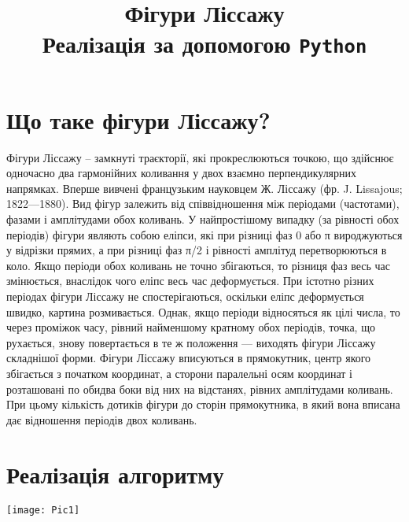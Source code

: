 \documentclass[14pt]{extarticle}
\title{Фігури Ліссажу\\ Реалізація за допомогою \texttt{Python}}
\date{}
\begin{document}
\maketitle

\section{Що таке фігури Ліссажу?}

Фігури Ліссажу -- замкнуті траєкторії, які прокреслюються точкою, що здійснює одночасно два гармонійних коливання у двох взаємно перпендикулярних напрямках. Вперше вивчені французьким науковцем Ж. Ліссажу (фр. J. Lissajous; 1822—1880). Вид фігур залежить від співвідношення між періодами (частотами), фазами і амплітудами обох коливань. У найпростішому випадку (за рівності обох періодів) фігури являють собою еліпси, які при різниці фаз 0 або π вироджуються у відрізки прямих, а при різниці фаз π/2 і рівності амплітуд перетворюються в коло. Якщо періоди обох коливань не точно збігаються, то різниця фаз весь час змінюється, внаслідок чого еліпс весь час деформується. При істотно різних періодах фігури Ліссажу не спостерігаються, оскільки еліпс деформується швидко, картина розмивається. Однак, якщо періоди відносяться як цілі числа, то через проміжок часу, рівний найменшому кратному обох періодів, точка, що рухається, знову повертається в те ж положення — виходять фігури Ліссажу складнішої форми. Фігури Ліссажу вписуються в прямокутник, центр якого збігається з початком координат, а сторони паралельні осям координат і розташовані по обидва боки від них на відстанях, рівних амплітудами коливань. При цьому кількість дотиків фігури до сторін прямокутника, в який вона вписана дає відношення періодів двох коливань.

\section{Реалізація алгоритму}

\begin{center}
    \texttt{[image: Pic1]}
\end{center}
\end{document}

